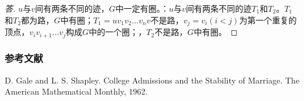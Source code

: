 \documentclass{beamer}
\theoremstyle{definition}
\theoremstyle{example}
\begin{document}
\begin{CJK}{UTF8}{gbsn}
\begin{frame}
\begin{proof}[答]
  $u$与$v$间有两条不同的迹，$G$中一定有圈。：$u$与$v$间有两条不同的迹$T_1$和$T_2$。$T_1$和$T_2$都为路，$G$中有圈；$T_1=uv_1v_2\ldots v_nv$不是路，$v_j=v_i(i<j)$为第一个重复的顶点，$v_iv_{i+1}\ldots v_j$构成$G$中的一个圈；，$T_2$不是路，\pause$G$中有圈。
\end{proof}
\end{frame}

\begin{frame}  
  \frametitle{参考文献}

    \begin{thebibliography}{99}
  D. Gale and L. S. Shapley.
\newblock College Admissions and the Stability of Marriage.
\newblock The American Mathematical Monthly,  1962.
  \end{thebibliography}

\end{frame}

\end{CJK}


%
%
\end{document}
